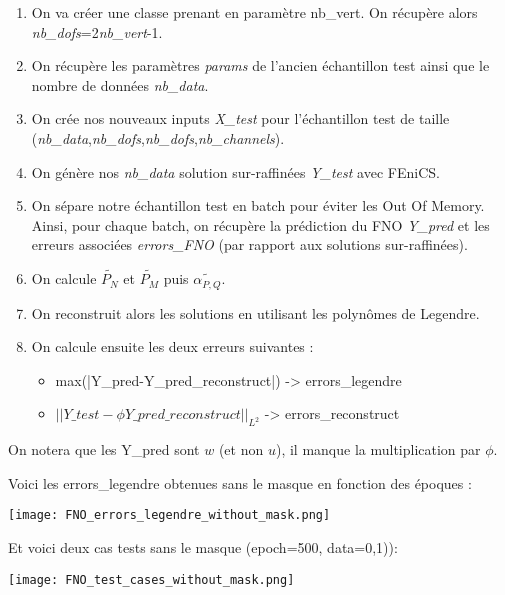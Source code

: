 \begin{enumerate}[label=\textbullet]
	\item On va créer une classe prenant en paramètre nb\_vert. On récupère alors \textit{nb\_dofs}=2\textit{nb\_vert}-1.
	\item On récupère les paramètres \textit{params} de l'ancien échantillon test ainsi que le nombre de données \textit{nb\_data}.
	\item On crée nos nouveaux inputs \textit{X\_test} pour l'échantillon test de taille (\textit{nb\_data},\textit{nb\_dofs},\textit{nb\_dofs},\textit{nb\_channels}).
	\item On génère nos \textit{nb\_data} solution sur-raffinées \textit{Y\_test} avec FEniCS.
	\item On sépare notre échantillon test en batch pour éviter les Out Of Memory. Ainsi, pour chaque batch, on récupère la prédiction du FNO \textit{Y\_pred} et les erreurs associées \textit{errors\_FNO} (par rapport aux solutions sur-raffinées).
	\item On calcule $\widetilde{P_N}$ et $\widetilde{P_M}$ puis $\widetilde{\alpha_{P,Q}}$.
	\item On reconstruit alors les solutions en utilisant les polynômes de Legendre.
	\item On calcule ensuite les deux erreurs suivantes :
	\begin{itemize}
		\item max(|Y\_pred-Y\_pred\_reconstruct|) -> errors\_legendre
		\item $||Y\_test-\phi Y\_pred\_reconstruct||_{L^2}$  -> errors\_reconstruct
	\end{itemize}
\end{enumerate}

\begin{Rem}
	On notera que les Y\_pred sont $w$ (et non $u$), il manque la multiplication par $\phi$.
\end{Rem}

Voici les errors\_legendre obtenues sans le masque en fonction des époques :

\begin{minipage}{\linewidth}
	\centering
	\texttt{[image: FNO\_errors\_legendre\_without\_mask.png]}
\end{minipage}

Et voici deux cas tests sans le masque (epoch=500, data=0,1)):

\begin{minipage}{\linewidth}
	\centering
	\texttt{[image: FNO\_test\_cases\_without\_mask.png]}
\end{minipage}

